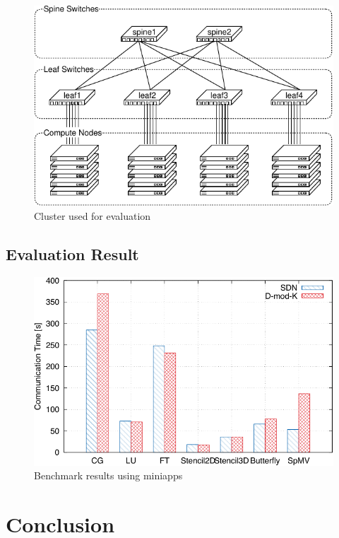 \documentclass[graybox]{svmult}
\begin{document}
\begin{figure}
    \centering
    \includegraphics{evaluation_cluster}
    \caption{Cluster used for evaluation}%
    \label{kt:fig:cluster}
\end{figure}

\subsection{Evaluation Result}

\begin{figure}
    \centering
    \includegraphics{benchmark_result}
    \caption{Benchmark results using miniapps}%
    \label{kt:fig:benchmark}
\end{figure}

\section{Conclusion}



\end{document}
